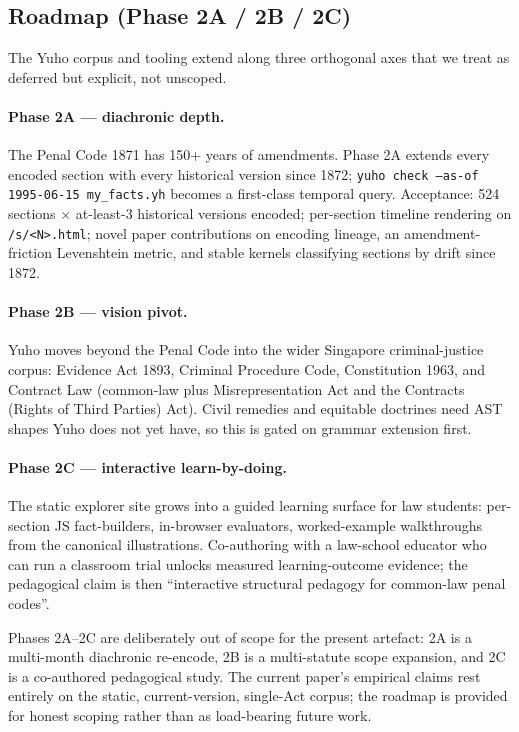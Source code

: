 \subsection{Roadmap (Phase 2A / 2B / 2C)}
\label{subsec:future_roadmap}

The Yuho corpus and tooling extend along three orthogonal axes that
we treat as deferred but explicit, not unscoped.

\paragraph{Phase 2A --- diachronic depth.} The Penal Code 1871 has
150+ years of amendments. Phase 2A extends every encoded section
with every historical version since 1872; \texttt{yuho check
--as-of 1995-06-15 my\_facts.yh} becomes a first-class temporal
query. Acceptance: 524 sections $\times$ at-least-3 historical
versions encoded; per-section timeline rendering on
\texttt{/s/<N>.html}; novel paper contributions on encoding
lineage, an amendment-friction Levenshtein metric, and stable
kernels classifying sections by drift since 1872.

\paragraph{Phase 2B --- vision pivot.} Yuho moves beyond the Penal
Code into the wider Singapore criminal-justice corpus: Evidence
Act 1893, Criminal Procedure Code, Constitution 1963, and Contract
Law (common-law plus Misrepresentation Act and the Contracts
(Rights of Third Parties) Act). Civil remedies and equitable
doctrines need AST shapes Yuho does not yet have, so this is
gated on grammar extension first.

\paragraph{Phase 2C --- interactive learn-by-doing.} The static
explorer site grows into a guided learning surface for law
students: per-section JS fact-builders, in-browser evaluators,
worked-example walkthroughs from the canonical illustrations.
Co-authoring with a law-school educator who can run a classroom
trial unlocks measured learning-outcome evidence; the pedagogical
claim is then ``interactive structural pedagogy for common-law
penal codes''.

\medskip

Phases 2A--2C are deliberately out of scope for the present
artefact: 2A is a multi-month diachronic re-encode, 2B is a
multi-statute scope expansion, and 2C is a co-authored pedagogical
study. The current paper's empirical claims rest entirely on the
static, current-version, single-Act corpus; the roadmap is
provided for honest scoping rather than as load-bearing future
work.
